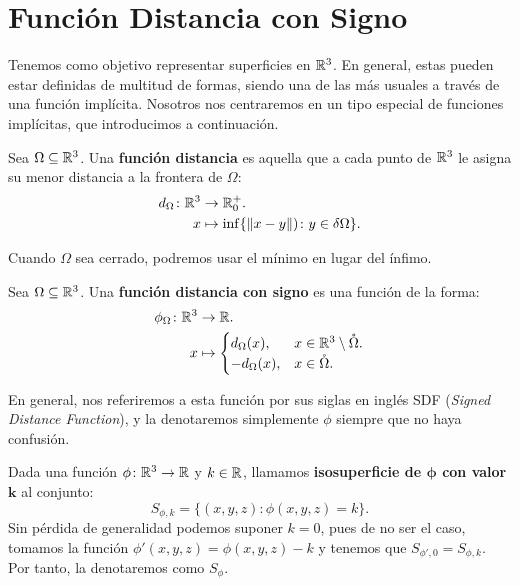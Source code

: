 \chapter{Función Distancia con Signo}
Tenemos como objetivo representar superficies en $\mathbb{R}^3$. En general, estas pueden estar definidas de multitud de formas, siendo una de las más usuales a través de una función implícita. Nosotros nos centraremos en un tipo especial de funciones implícitas, que introducimos a continuación.

\begin{definicion}
  Sea $\Omega \subseteq \mathbb{R}^3$. Una \textbf{función distancia} es aquella que a cada punto de $\mathbb{R}^3$ le asigna su menor distancia a la frontera de $\Omega$:
    \begin{align*}
          d_{\Omega} \colon \mathbb{R}^3 &\to \mathbb{R}_0^+.\\
          x &\mapsto \inf\{\Vert x-y\Vert) \colon y \in \delta\Omega\}.
    \end{align*}

    Cuando $\Omega$ sea cerrado, podremos usar el mínimo en lugar del ínfimo.
\end{definicion}
 
\begin{definicion}[SDF]\label{d:sdf}
  Sea $\Omega \subseteq \mathbb{R}^3$. Una \textbf{función distancia con signo} es una función de la forma:
  \begin{align*}
          \phi_{\Omega} \colon \mathbb{R}^3 &\to \mathbb{R}.\\
          x &\mapsto \begin{cases}
      d_{\Omega}(x),  &x\in \mathbb{R}^3\setminus \mathring{\Omega}. \\
      -d_{\Omega}(x), &x\in \mathring{\Omega}.
    \end{cases}
    \end{align*}

  En general, nos referiremos a esta función por sus siglas en inglés SDF (\textit{Signed Distance Function}), y la denotaremos simplemente $\phi$ siempre que no haya confusión.
\end{definicion}

\begin{definicion}
  Dada una función $\phi\colon \mathbb{R}^3 \to \mathbb{R}$ y $k\in\mathbb{R}$, llamamos \textbf{isosuperficie de $\boldsymbol{\phi}$ con valor $\boldsymbol{k}$} al conjunto:
  \begin{equation*}
      S_{\phi,k} = \{(x,y,z) :  \phi(x,y,z)=k\}.
  \end{equation*}
  Sin pérdida de generalidad podemos suponer $k=0$, pues de no ser el caso, tomamos la función $\phi'(x,y,z)=\phi(x,y,z)-k$ y tenemos que $S_{\phi',0} = S_{\phi,k}$. Por tanto, la denotaremos como $S_\phi$.
\end{definicion}

